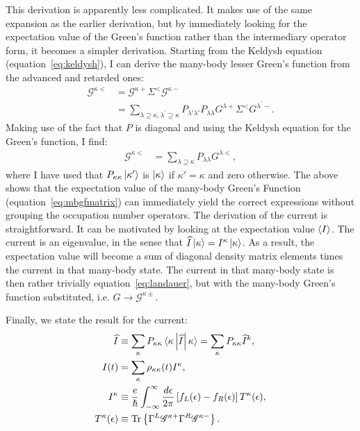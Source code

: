 This derivation is apparently less complicated. It makes use of the same expansion as the earlier derivation, but by immediately looking for the expectation value of the Green's function rather than the intermediary operator form, it becomes a simpler derivation. Starting from the Keldysh equation (equation~\ref{eq:keldysh}), I can derive the many-body lesser Green's function from the advanced and retarded ones:
\begin{align*}
    \mathscr{G}^{\kappa<} &= \mathscr{G}^{\kappa+} \Sigma^< \mathscr{G}^{\kappa-} \\
    &= \sum_{\lambda\supseteq\kappa, \lambda^\prime \supseteq\kappa}P_{\lambda'\lambda'} P_{\lambda\lambda} G^{\lambda+} \Sigma^< G^{\lambda^\prime-}.
\end{align*}
Making use of the fact that $P$ is diagonal and using the Keldysh equation for the Green's function, I find:
\begin{align}
    \mathscr{G}^{\kappa<} &= \sum_{\lambda\supseteq\kappa} P_{\lambda\lambda} G^{\lambda<} \label{eq:mblessergf},
\end{align} where I have used that $P_{\kappa\kappa} \ket{\kappa'}$ is $\ket{\kappa}$ if $\kappa'=\kappa$ and zero otherwise. The above shows that the expectation value of the many-body Green's Function (equation~\ref{eq:mbgfmatrix}) can immediately yield the correct expressions without grouping the occupation number operators.
The derivation of the current is straightforward. It can be motivated by looking at the expectation value $\braket{I}$. The current is an eigenvalue, in the sense that $ \widehat{I} \ket{\kappa} = I^\kappa \ket{\kappa}$. As a result, the expectation value will become a sum of diagonal density matrix elements times the current in that many-body state. The current in that many-body state is then rather trivially equation~\ref{eq:landauer}, but with the many-body Green's function substituted, i.e. $G \rightarrow \mathscr{G}^{\kappa\pm}$.

Finally, we state the result for the current:
\begin{align*}
\widehat{I} &\equiv \sum_\kappa P_{\kappa\kappa} \braket{ \kappa \left|\widehat{I}\right|\kappa}=\sum_\kappa P_{\kappa\kappa} \widehat{I}^k,\\ 
I(t) &= \sum_\kappa \rho_{\kappa\kappa}(t) I^\kappa, \\
I^\kappa&\equiv \frac{e}{\hslash} \int^\infty_{-\infty} \frac{d\epsilon}{2\pi} \left[ f_L(\epsilon) - f_R (\epsilon) \right] T^\kappa (\epsilon),\\
T^\kappa(\epsilon) &\equiv \text{Tr}\left\{ \Gamma^L \mathscr{G}^{\kappa+} \Gamma^R \mathscr{G}^{\kappa-} \right\}.
\end{align*}



